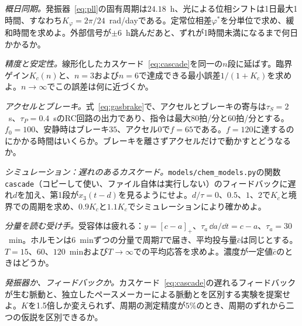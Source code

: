 \begin{exercise}[\lvlA]
\label{ex:16:2}
\emph{概日同期。}発振器~\eqref{eq:pll}の固有周期は$24.18$~h、光による位相シフトは1日最大1時間、すなわち$K_\varphi=2\pi/24$~rad/dayである。定常位相差$\varphi^*$を分単位で求め、緩和時間を求めよ。外部信号が$\pm6$~h跳んだあと、ずれが1時間未満になるまで何日かかるか。
\end{exercise}

\begin{exercise}[\lvlB]
\label{ex:16:3}
\emph{精度と安定性。}線形化したカスケード~\eqref{eq:cascade}を同一の$n$段に延ばす。臨界ゲイン$K_c(n)$と、$n=3$および$n=6$で達成できる最小誤差$1/(1+K_c)$を求めよ。$n\to\infty$でこの誤差は何に近づくか。
\end{exercise}

\begin{exercise}[\lvlB]
\label{ex:16:4}
\emph{アクセルとブレーキ。}式~\eqref{eq:gasbrake}で、アクセルとブレーキの寄与は$\tau_S=2$~s、$\tau_P=0.4$~sのRC回路の出力であり、指令は最大$80$拍/分と$60$拍/分とする。$f_0=100$、安静時はブレーキ$35$、アクセル$0$で$f=65$である。$f=120$に達するのにかかる時間はいくらか。ブレーキを離さずアクセルだけで動かすとどうなるか。
\end{exercise}

\begin{exercise}[\lvlB]
\label{ex:16:5}
\emph{シミュレーション：遅れのあるカスケード。}\texttt{models/\allowbreak chem\_models.py}の関数\texttt{cascade}（コピーして使い、ファイル自体は実行しない）のフィードバックに遅れ$d$を加え、第1段が$x_3(t-d)$を見るようにせよ。$d/\tau=0$、$0.5$、$1$、$2$で$K_c$と境界での周期を求め、$0.9K_c$と$1.1K_c$でシミュレーションにより確かめよ。
\end{exercise}

\begin{exercise}[\lvlB]
\label{ex:16:6}
\emph{分量を読む受け手。}受容体は疲れる：$y=[c-a]_+$、$\tau_a\,\dd a/\dd t=c-a$、$\tau_a=30$~min。ホルモンは$6$~minずつの分量で周期$T$で届き、平均投与量$\bar c$は同じとする。$T=15$、$60$、$120$~minおよび$T\to\infty$での平均応答を求めよ。濃度が一定値$\bar c$のときはどうか。
\end{exercise}

\begin{exercise}[\lvlC]
\label{ex:16:7}
\emph{発振器か、フィードバックか。}カスケード~\eqref{eq:cascade}の遅れるフィードバックが生む脈動と、独立したペースメーカーによる脈動とを区別する実験を提案せよ。$K$を1.5倍しか変えられず、周期の測定精度が$5\%$のとき、周期のずれから二つの仮説を区別できるか。
\end{exercise}
